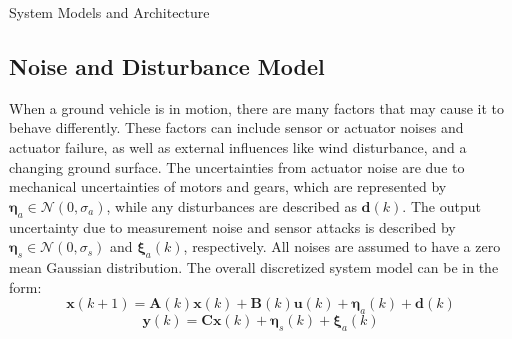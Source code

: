 \begin{section}{System Models and Architecture}
 \subsection{Noise and Disturbance Model}
When a ground vehicle is in motion, there are many factors that may cause it to behave differently. These factors can include sensor or actuator noises and actuator failure, as well as external influences like wind disturbance, and a changing ground surface. The uncertainties from actuator noise are due to mechanical uncertainties of motors and gears, which are represented by $ \bm{\eta}_a \in \mathcal{N}(0,\sigma_a) $, while any disturbances are described as $\bm{d}(k)$. The output uncertainty due to measurement noise and sensor attacks is described by $ \bm{\eta}_s \in \mathcal{N}(0,\sigma_s) $ and $\bm{\xi}_a(k)$, respectively. All noises are assumed to have a zero mean Gaussian distribution. The overall discretized system model can be in the form:
    \begin{equation}
	\bm{x}(k+1)=\bm{A}(k)\bm{x}(k)+\bm{B}(k)\bm{u}(k)+\bm{\eta}_a(k)+\bm{d}(k)
	\end{equation}
	\begin{equation}
	\bm{y}(k)=\bm{C}\bm{x}(k)+\bm{\eta}_s(k)+\bm{\xi}_a(k)
	\end{equation}


\end{section}
